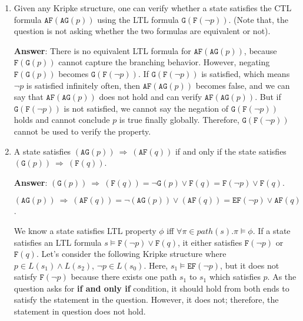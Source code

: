 \documentclass[11pt]{article}
\newcommand{\af}[1]{\texttt{AF}(#1)}
\newcommand{\ef}[1]{\texttt{EF}(#1)}
\newcommand{\ag}[1]{\texttt{AG}(#1)}
\newcommand{\lf}[1]{\texttt{F}(#1)}
\newcommand{\llg}[1]{\texttt{G}(#1)}
\begin{document}
\begin{enumerate}
\begin{enumerate}
  \item Given any Kripke structure, one can verify whether a state
    satisfies the CTL formula $\af{\ag{p}}$ using the LTL formula
    $\llg{\lf{\neg p}}$. (Note that, the question is not asking
    whether the two formulas are equivalent or not).
    
\textbf{Answer}: There is no equivalent LTL formula for $\af{\ag{p}}$, because $\lf{\llg{p}}$ cannot capture the branching behavior. However, negating $\lf{\llg{p}}$ becomes $\llg{\lf{\neg p}}$. If $\llg{\lf{\neg p}}$ is satisfied, which means $\neg p$ is satisfied infinitely often, then $\af{\ag{p}}$ becomes false, and we can say that $\af{\ag{p}}$ does not hold and can verify $\af{\ag{p}}$. But if $\llg{\lf{\neg p}}$ is not satisfied, we cannot say the negation of $\llg{\lf{\neg p}}$  holds and cannot conclude $p$ is true finally globally. Therefore, $\llg{\lf{\neg p}}$ cannot be used to verify the property. 

   
  \item A state satisfies $(\ag{p}) \ \Rightarrow\ (\af{q})$ if and only
    if the state satisfies $(\llg{p}) \ \Rightarrow\ (\lf{q})$.

\textbf{Answer}: $(\llg{p}) \ \Rightarrow\ (\lf{q}) = \neg \llg{p} \lor \lf{q} = \lf{\neg p} \lor \lf{q}$. 

$(\ag{p}) \ \Rightarrow\ (\af{q}) = \neg (\ag{p}) \lor (\af{q}) = \ef{\neg p} \lor \af{q}$. 

We know a state satisfies LTL property $\phi$ iff $\forall \pi \in path(s). \pi \models \phi$. 
If a state satisfies an LTL formula $s \models \lf{\neg p} \lor \lf{q}$, it either satisfies $\lf{\neg p}$ or $\lf{q}$. Let's consider the following Kripke structure where $p \in L(s_1) \land L(s_2)$, $\neg p \in L(s_0)$. 
Here, $s_1 \models \ef{\neg p}$, but it does not satisfy $\lf{\neg p}$ because there exists one path $s_1$ to $s_1$ which satisfies $p$. As the question asks for \textbf{if and only if } condition, it should hold from both ends to satisfy the statement in the question. However, it does not; therefore, the statement in question does not hold. 

    \begin{center}
\end{center}
\end{enumerate}
\end{enumerate}
\end{document}
